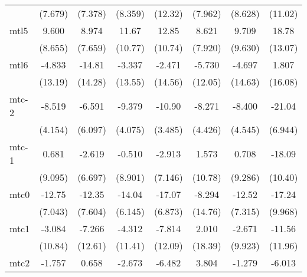 \documentclass{article}
\begin{document}
{\begin{longtable}{l*{7}{c}}
                &  (7.679)         &  (7.378)         &  (8.359)         &  (12.32)         &  (7.962)         &  (8.628)         &  (11.02)         \\
mtl5            &    9.600         &    8.974         &    11.67         &    12.85         &    8.621         &    9.709         &    18.78         \\
                &  (8.655)         &  (7.659)         &  (10.77)         &  (10.74)         &  (7.920)         &  (9.630)         &  (13.07)         \\
mtl6            &   -4.833         &   -14.81         &   -3.337         &   -2.471         &   -5.730         &   -4.697         &    1.807         \\
                &  (13.19)         &  (14.28)         &  (13.55)         &  (14.56)         &  (12.05)         &  (14.63)         &  (16.08)         \\
mtc-2           &   -8.519         &   -6.591         &   -9.379         &   -10.90\sym{*}  &   -8.271         &   -8.400         &   -21.04\sym{*}  \\
                &  (4.154)         &  (6.097)         &  (4.075)         &  (3.485)         &  (4.426)         &  (4.545)         &  (6.944)         \\
mtc-1           &    0.681         &   -2.619         &   -0.510         &   -2.913         &    1.573         &    0.708         &   -18.09         \\
                &  (9.095)         &  (6.697)         &  (8.901)         &  (7.146)         &  (10.78)         &  (9.286)         &  (10.40)         \\
mtc0            &   -12.75         &   -12.35         &   -14.04         &   -17.07         &   -8.294         &   -12.52         &   -17.24         \\
                &  (7.043)         &  (7.604)         &  (6.145)         &  (6.873)         &  (14.76)         &  (7.315)         &  (9.968)         \\
mtc1            &   -3.084         &   -7.266         &   -4.312         &   -7.814         &    2.010         &   -2.671         &   -11.56         \\
                &  (10.84)         &  (12.61)         &  (11.41)         &  (12.09)         &  (18.39)         &  (9.923)         &  (11.96)         \\
mtc2            &   -1.757         &    0.658         &   -2.673         &   -6.482         &    3.804         &   -1.279         &   -6.013         \\

\end{longtable}}
\end{document}
